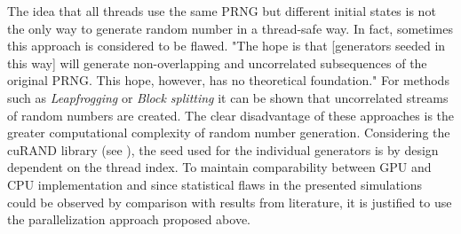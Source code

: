 \begin{enumerate}
The idea that all threads use the same PRNG but different initial states is not the only way to generate random number in a thread-safe way. In fact, sometimes this approach is considered to be flawed. "The hope is that [generators seeded in this way] will generate non-overlapping and uncorrelated subsequences of the original PRNG. This hope, however, has no theoretical foundation." \cite{bauke_tinas_????} For methods such as \textit{Leapfrogging} or \textit{Block splitting} it can be shown that uncorrelated streams of random numbers are created. The clear disadvantage of these approaches is the greater computational complexity of random number generation. Considering the cuRAND library (see \cite{nvidia_curand_2014}), the seed used for the individual generators is by design dependent on the thread index. To maintain comparability between GPU and CPU implementation and since statistical flaws in the presented simulations could be observed by comparison with results from literature, it is justified to use the parallelization approach proposed above. 


\end{enumerate}
